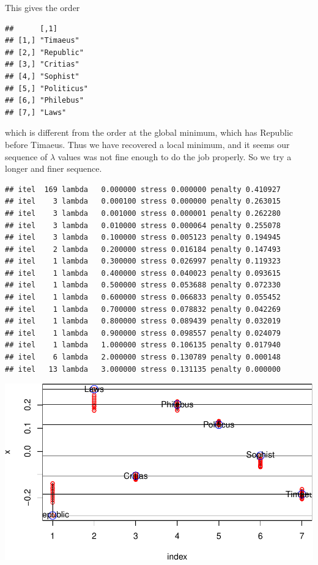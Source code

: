 \documentclass[
  12pt,
]{article}
\begin{document}
This gives the order

\begin{verbatim}
##      [,1]       
## [1,] "Timaeus"  
## [2,] "Republic" 
## [3,] "Critias"  
## [4,] "Sophist"  
## [5,] "Politicus"
## [6,] "Philebus" 
## [7,] "Laws"
\end{verbatim}

which is different from the order at the global minimum, which has
Republic before Timaeus. Thus we have recovered a local minimum, and it
seems our sequence of \(\lambda\) values was not fine enough to do the
job properly. So we try a longer and finer sequence.

\begin{verbatim}
## itel  169 lambda   0.000000 stress 0.000000 penalty 0.410927 
## itel    3 lambda   0.000100 stress 0.000000 penalty 0.263015 
## itel    3 lambda   0.001000 stress 0.000001 penalty 0.262280 
## itel    3 lambda   0.010000 stress 0.000064 penalty 0.255078 
## itel    3 lambda   0.100000 stress 0.005123 penalty 0.194945 
## itel    2 lambda   0.200000 stress 0.016184 penalty 0.147493 
## itel    1 lambda   0.300000 stress 0.026997 penalty 0.119323 
## itel    1 lambda   0.400000 stress 0.040023 penalty 0.093615 
## itel    1 lambda   0.500000 stress 0.053688 penalty 0.072330 
## itel    1 lambda   0.600000 stress 0.066833 penalty 0.055452 
## itel    1 lambda   0.700000 stress 0.078832 penalty 0.042269 
## itel    1 lambda   0.800000 stress 0.089439 penalty 0.032019 
## itel    1 lambda   0.900000 stress 0.098557 penalty 0.024079 
## itel    1 lambda   1.000000 stress 0.106135 penalty 0.017940 
## itel    6 lambda   2.000000 stress 0.130789 penalty 0.000148 
## itel   13 lambda   3.000000 stress 0.131135 penalty 0.000000
\end{verbatim}

\begin{center}\includegraphics{penalty_files/figure-latex/plato2-1} \end{center}
\end{document}

